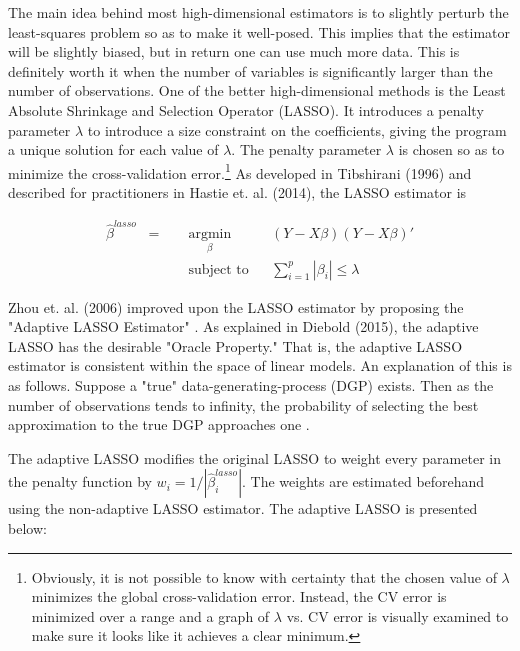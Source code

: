 \documentclass[AER]{AEA}
\begin{document}
The main idea behind most high-dimensional estimators is to slightly perturb the least-squares problem so as to make it well-posed. This implies that the estimator will be slightly biased, but in return one can use much more data. This is definitely worth it when the number of variables is significantly larger than the number of observations. One of the better high-dimensional methods is the Least Absolute Shrinkage and Selection Operator (LASSO).\cite{LASSO,ESL} It introduces a penalty parameter $\lambda$ to introduce a size constraint on the coefficients, giving the program a unique solution for each value of $\lambda$. The penalty parameter $\lambda$ is chosen so as to minimize the cross-validation error.\footnote{Obviously, it is not possible to know with certainty that the chosen value of $\lambda$ minimizes the global cross-validation error. Instead, the CV error is minimized over a range and a graph of $\lambda$ vs. CV error is visually examined to make sure it looks like it achieves a clear minimum. } As developed in Tibshirani (1996) and described for practitioners in Hastie et. al. (2014), the LASSO estimator is

\[
\begin{aligned}
\hat{\beta}^{lasso} \;\; = \quad
& \underset{\beta}{\text{argmin}}
& & \left( Y - X\beta \right)\left( Y - X\beta \right)' \\
& \text{subject to}
& & \sum_{i=1}^p |\beta_i| \leq \lambda
\end{aligned}
\]

Zhou et. al. (2006) improved upon the LASSO estimator by proposing  the "Adaptive LASSO Estimator" \cite{adaptiveLASSO}. As explained in Diebold (2015), the adaptive LASSO has the desirable "Oracle Property." That is, the adaptive LASSO estimator is consistent within the space of linear models. An  explanation of this is as follows. Suppose a "true" data-generating-process (DGP) exists. Then as the number of observations tends to  infinity, the probability of selecting the best approximation to the true DGP approaches one \cite{dieboldForecasting}.

The adaptive LASSO modifies the original LASSO to weight every parameter in the penalty function by $w_i=1/|\hat{\beta}_i^{lasso}|$. The weights are estimated beforehand using the non-adaptive LASSO estimator. The adaptive LASSO is presented below:
\end{document}
